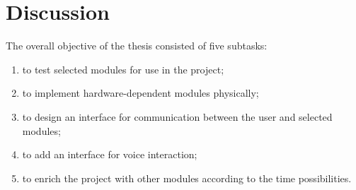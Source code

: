 \chapter{Discussion} \label{chap:discussion}

The overall objective of the thesis consisted of five subtasks:

\begin{enumerate}
    \item to test selected modules for use in the project;
    \item to implement hardware-dependent modules physically;
    \item to design an interface for communication between the user and selected modules;
    \item to add an interface for voice interaction;
    \item to enrich the project with other modules according to the time possibilities.
\end{enumerate}








   


